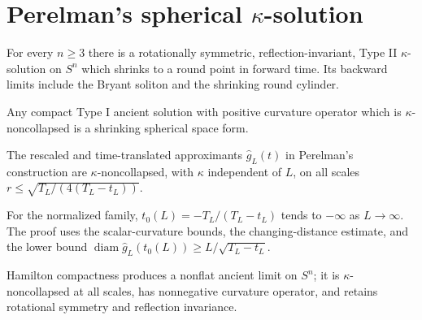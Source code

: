 \section{\texorpdfstring{Perelman's spherical $\kappa$-solution}{Perelman's spherical Kappa-solution}}

\begin{theorem}
\label{thm:chow-iii-perelman-sphere}
For every $n\ge3$ there is a rotationally symmetric, reflection-invariant,
Type II $\kappa$-solution on $S^n$ which shrinks to a round point in forward
time.  Its backward limits include the Bryant soliton and the shrinking round
cylinder.
\end{theorem}

\begin{theorem}
\label{thm:chow-iii-compact-type-i}
Any compact Type I ancient solution with positive curvature operator which is
$\kappa$-noncollapsed is a shrinking spherical space form.
\end{theorem}

\begin{lemma}
\label{lem:chow-iii-normalized-family-noncollapsed}
The rescaled and time-translated approximants $\hat g_L(t)$ in Perelman's
construction are $\kappa$-noncollapsed, with $\kappa$ independent of $L$, on
all scales $r\le\sqrt{T_L/(4(T_L-t_L))}$.
\end{lemma}

\begin{proposition}
\label{prop:chow-iii-normalized-family-ancient}
For the normalized family, $t_0(L)=-T_L/(T_L-t_L)$ tends to $-\infty$ as
$L\to\infty$.  The proof uses the scalar-curvature bounds, the changing-distance
estimate, and the lower bound $\operatorname{diam}\hat g_L(t_0(L))\ge
L/\sqrt{T_L-t_L}$.
\end{proposition}

\begin{proposition}
\label{prop:chow-iii-perelman-limit-properties}
Hamilton compactness produces a nonflat ancient limit on $S^n$; it is
$\kappa$-noncollapsed at all scales, has nonnegative curvature operator, and
retains rotational symmetry and reflection invariance.
\end{proposition}

